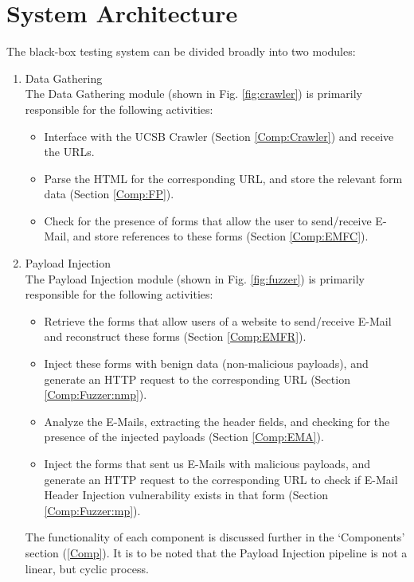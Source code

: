 \section{System Architecture}
\label{sys:arch}
The black-box testing system can be divided broadly into two modules:
\begin{enumerate}
	\item Data Gathering\\
	The Data Gathering module (shown in Fig. \ref{fig:crawler}) is primarily responsible for the following activities:
	\begin{itemize}
		\item Interface with the UCSB Crawler (Section \ref{Comp:Crawler}) and receive the URLs.
		\item Parse the HTML for the corresponding URL, and store the relevant form data (Section \ref{Comp:FP}).
		\item Check for the presence of forms that allow the user to send/receive E-Mail, and store references to these forms (Section \ref{Comp:EMFC}).
	\end{itemize} 
	\item Payload Injection\\
	The Payload Injection module (shown in Fig. \ref{fig:fuzzer}) is primarily responsible for the following activities:
	\begin{itemize}
		\item Retrieve the forms that allow users of a website to send/receive E-Mail and reconstruct these forms (Section \ref{Comp:EMFR}).
		\item Inject these forms with benign data (non-malicious payloads), and generate an HTTP request to the corresponding URL (Section \ref{Comp:Fuzzer:nmp}).
		\item Analyze the E-Mails, extracting the header fields, and checking for the presence of the injected payloads (Section \ref{Comp:EMA}).
		\item Inject the forms that sent us E-Mails with malicious payloads, and generate an HTTP request to the corresponding URL to check if E-Mail Header Injection vulnerability exists in that form (Section \ref{Comp:Fuzzer:mp}).
	\end{itemize} 
	The functionality of each component is discussed further in the `Components' section (\ref{Comp}). It is to be noted that the Payload Injection pipeline is not a linear, but cyclic process.
\end{enumerate}

